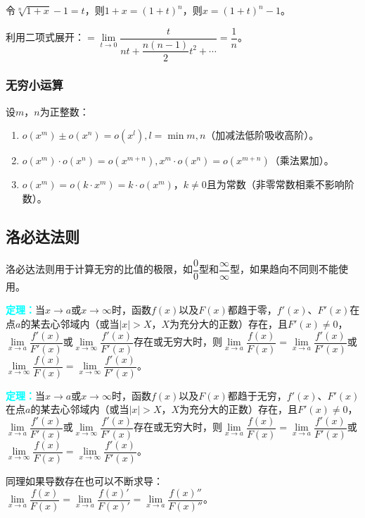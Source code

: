 \documentclass[UTF8, 12pt]{ctexart}
\begin{document}
        令$\sqrt[n]{1+x}-1=t$，则$1+x=(1+t)^n$，则$x=(1+t)^n-1$。

        利用二项式展开：$=\lim\limits_{t\to 0}\dfrac{t}{nt+\dfrac{n(n-1)}{2}t^2+\cdots}=\dfrac{1}{n}$。

        \subsubsection{无穷小运算}

        设$m$，$n$为正整数：

        \begin{enumerate}
            \item $o(x^m)\pm o(x^n)=o(x^l),l=\min{m,n}$（加减法低阶吸收高阶）。
            \item $o(x^m)\cdot o(x^n)=o(x^{m+n}),x^m\cdot o(x^n)=o(x^{m+n})$（乘法累加）。
            \item $o(x^m)=o(k\cdot x^m)=k\cdot o(x^m)$，$k\neq 0$且为常数（非零常数相乘不影响阶数）。
        \end{enumerate}

        \subsection{洛必达法则}

        洛必达法则用于计算无穷的比值的极限，如$\dfrac{0}{0}$型和$\dfrac{\infty}{\infty}$型，如果趋向不同则不能使用。

        \textcolor{aqua}{\textbf{定理：}}当$x\to a$或$x\to\infty$时，函数$f(x)$以及$F(x)$都趋于零，$f'(x)$、$F'(x)$在点$a$的某去心邻域内（或当$\vert x\vert>X$，$X$为充分大的正数）存在，且$F'(x)\neq0$，$\lim\limits_{x\to a}\dfrac{f'(x)}{F'(x)}$或$\lim\limits_{x\to\infty}\dfrac{f'(x)}{F'(x)}$存在或无穷大时，则$\lim\limits_{x\to a}\dfrac{f(x)}{F(x)}=\lim\limits_{x\to a}\dfrac{f'(x)}{F'(x)}$或$\lim\limits_{x\to\infty}\dfrac{f(x)}{F(x)}=\lim\limits_{x\to\infty}\dfrac{f'(x)}{F'(x)}$。

        \textcolor{aqua}{\textbf{定理：}}当$x\to a$或$x\to\infty$时，函数$f(x)$以及$F(x)$都趋于无穷，$f'(x)$、$F'(x)$在点$a$的某去心邻域内（或当$\vert x\vert>X$，$X$为充分大的正数）存在，且$F'(x)\neq0$，$\lim\limits_{x\to a}\dfrac{f'(x)}{F'(x)}$或$\lim\limits_{x\to\infty}\dfrac{f'(x)}{F'(x)}$存在或无穷大时，则$\lim\limits_{x\to a}\dfrac{f(x)}{F(x)}=\lim\limits_{x\to a}\dfrac{f'(x)}{F'(x)}$或$\lim\limits_{x\to\infty}\dfrac{f(x)}{F(x)}=\lim\limits_{x\to\infty}\dfrac{f'(x)}{F'(x)}$。

        同理如果导数存在也可以不断求导：$\lim\limits_{x\to a}\dfrac{f(x)}{F(x)}=\lim\limits_{x\to a}\dfrac{f(x)'}{F(x)'}=\lim\limits_{x\to a}\dfrac{f(x)''}{F(x)''}$。
\end{document}

